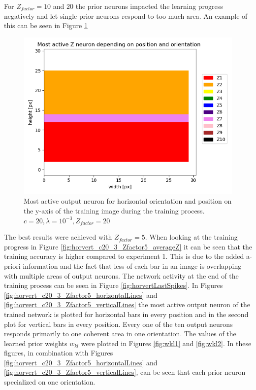 For $Z_{factor} = 10$ and $20$ the prior neurons impacted the learning progress negatively and let single prior neurons respond to too much area. An example of this can be seen in Figure \ref{fig:horvert_c20_3_Zfactor20_horizontalLines}

\begin{figure}
  \includegraphics[width=\linewidth]{figures/horvert/horvert_c20_3_Zfactor20_horizontalLines.png}
  \caption{Most active output neuron for horizontal orientation and position on the y-axis of the training image during the training process. $c = 20, \lambda = 10^{-3}, Z_{factor} = 20$}
  \label{fig:horvert_c20_3_Zfactor20_horizontalLines}
\end{figure}


The best results were achieved with $Z_{factor} = 5$. When looking at the training progress in Figure \ref{fig:horvert_c20_3_Zfactor5_averageZ} it can be seen that the training accuracy is higher compared to experiment 1. This is due to the added a-priori information and the fact that less of each bar in an image is overlapping with multiple areas of output neurons. The network activity at the end of the training process can be seen in Figure \ref{fig:horvertLastSpikes}. In Figures \ref{fig:horvert_c20_3_Zfactor5_horizontalLines} and \ref{fig:horvert_c20_3_Zfactor5_verticalLines} the most active output neuron of the trained network is plotted for horizontal bars in every position and in the second plot for vertical bars in every position. Every one of the ten output neurons responds primarily to one coherent area in one orientation. The values of the learned prior weights $w_{kl}$ were plotted in Figures \ref{fig:wkl1} and \ref{fig:wkl2}. In these figures, in combination with Figures \ref{fig:horvert_c20_3_Zfactor5_horizontalLines} and \ref{fig:horvert_c20_3_Zfactor5_verticalLines}, can be seen that each prior neuron specialized on one orientation.


